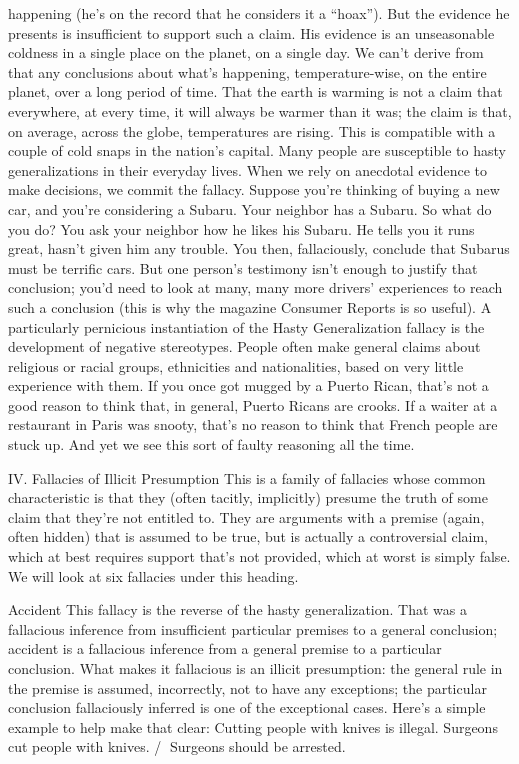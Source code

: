 happening (he’s on the record that he considers it a “hoax”). But the evidence he presents is
insufficient to support such a claim. His evidence is an unseasonable coldness in a single place on
the planet, on a single day. We can’t derive from that any conclusions about what’s happening,
temperature-wise, on the entire planet, over a long period of time. That the earth is warming is not
a claim that everywhere, at every time, it will always be warmer than it was; the claim is that, on
average, across the globe, temperatures are rising. This is compatible with a couple of cold snaps
in the nation’s capital.
Many people are susceptible to hasty generalizations in their everyday lives. When we rely on
anecdotal evidence to make decisions, we commit the fallacy. Suppose you’re thinking of buying
a new car, and you’re considering a Subaru. Your neighbor has a Subaru. So what do you do? You
ask your neighbor how he likes his Subaru. He tells you it runs great, hasn’t given him any trouble.
You then, fallaciously, conclude that Subarus must be terrific cars. But one person’s testimony
isn’t enough to justify that conclusion; you’d need to look at many, many more drivers’
experiences to reach such a conclusion (this is why the magazine Consumer Reports is so useful).
A particularly pernicious instantiation of the Hasty Generalization fallacy is the development of
negative stereotypes. People often make general claims about religious or racial groups, ethnicities
and nationalities, based on very little experience with them. If you once got mugged by a Puerto
Rican, that’s not a good reason to think that, in general, Puerto Ricans are crooks. If a waiter at a
restaurant in Paris was snooty, that’s no reason to think that French people are stuck up. And yet
we see this sort of faulty reasoning all the time.

IV. Fallacies of Illicit Presumption
This is a family of fallacies whose common characteristic is that they (often tacitly, implicitly)
presume the truth of some claim that they’re not entitled to. They are arguments with a premise
(again, often hidden) that is assumed to be true, but is actually a controversial claim, which at best
requires support that’s not provided, which at worst is simply false. We will look at six fallacies
under this heading.

Accident
This fallacy is the reverse of the hasty generalization. That was a fallacious inference from
insufficient particular premises to a general conclusion; accident is a fallacious inference from a
general premise to a particular conclusion. What makes it fallacious is an illicit presumption: the
general rule in the premise is assumed, incorrectly, not to have any exceptions; the particular
conclusion fallaciously inferred is one of the exceptional cases.
Here’s a simple example to help make that clear:
Cutting people with knives is illegal.
Surgeons cut people with knives.
/ Surgeons should be arrested.


